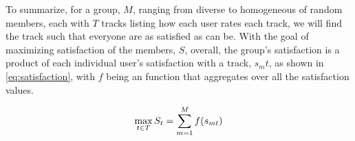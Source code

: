 To summarize, for a group, $M$, ranging from diverse to homogeneous of random members, each with $T$ tracks listing how each user rates each track, we will find the track such that everyone are as satisfied as can be. With the goal of maximizing satisfaction of the members, $S$, overall, the group's satisfaction is a product of each individual user's satisfaction with a track, $s_mt$, as shown in \ref{eq:satisfaction}, with $f$ being an function that aggregates over all the satisfaction values.

\begin{equation}\label{eq:satisfaction}
	\centering
	\max_{t \in T} S_t = \sum_{m=1}^{M} f(s_{mt})
\end{equation}

